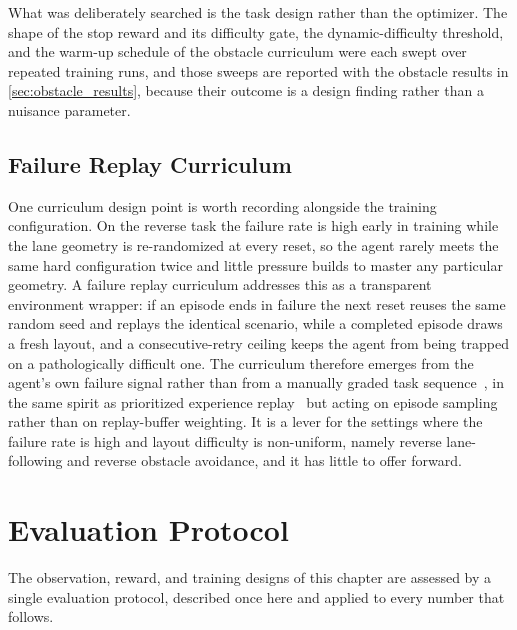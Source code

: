 What was deliberately searched is the task design rather than the optimizer. The shape of the stop reward and its difficulty gate, the dynamic-difficulty threshold, and the warm-up schedule of the obstacle curriculum were each swept over repeated training runs, and those sweeps are reported with the obstacle results in \cref{sec:obstacle_results}, because their outcome is a design finding rather than a nuisance parameter.

\subsection{Failure Replay Curriculum}
\label{sec:failure_replay}

One curriculum design point is worth recording alongside the training configuration. On the reverse task the failure rate is high early in training while the lane geometry is re-randomized at every reset, so the agent rarely meets the same hard configuration twice and little pressure builds to master any particular geometry. A failure replay curriculum addresses this as a transparent environment wrapper: if an episode ends in failure the next reset reuses the same random seed and replays the identical scenario, while a completed episode draws a fresh layout, and a consecutive-retry ceiling keeps the agent from being trapped on a pathologically difficult one. The curriculum therefore emerges from the agent's own failure signal rather than from a manually graded task sequence~\cite{bengio2009curriculum}, in the same spirit as prioritized experience replay~\cite{schaul2016per} but acting on episode sampling rather than on replay-buffer weighting. It is a lever for the settings where the failure rate is high and layout difficulty is non-uniform, namely reverse lane-following and reverse obstacle avoidance, and it has little to offer forward.

\section{Evaluation Protocol}
\label{sec:eval_methodology}
\label{sec:eval_setup}

The observation, reward, and training designs of this chapter are assessed by a single evaluation protocol, described once here and applied to every number that follows.


